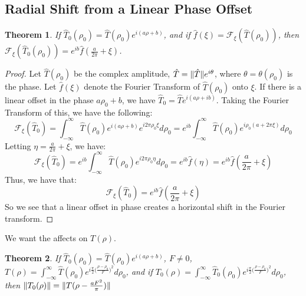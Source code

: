 \documentclass{article}
\theoremstyle{mystyle}
\newtheorem{theorem}{Theorem}[section]
\DeclarePairedDelimiter\norm{\lVert}{\rVert}
\begin{document}
\subsection{Radial Shift from a Linear Phase Offset}
\begin{theorem}
If $\hat{T}_0(\rho_0) = \hat{T}(\rho_0)e^{i(a\rho+b)}$, and if $\hat{f}(\xi) = \mathcal{F}_{\xi}(\hat{T}(\rho_0))$, then $\mathcal{F}_{\xi}(\hat{T}_{0}(\rho_0)) = e^{ib}\hat{f}(\frac{a}{2\pi}+\xi)$.
\end{theorem}
\begin{proof}
\noindent Let $\hat{T}(\rho_0)$ be the complex amplitude, $\hat{T} = \norm{\hat{T}}e^{i\theta}$, where $\theta = \theta(\rho_0)$ is the phase. Let $\hat{f}(\xi)$ denote the Fourier Transform of $\hat{T}(\rho_0)$ onto $\xi$. If there is a linear offset in the phase $a\rho_0+b$, we have $\hat{T}_{0} = \hat{T}e^{i(a\rho+ib)}$. Taking the Fourier Transform of this, we have the following:
\begin{equation*}
\mathcal{F}_{\xi} (\hat{T}_{0})= \int_{-\infty}^{\infty}\hat{T}(\rho_0)e^{i(a\rho+b)}e^{i2\pi \rho_0 \xi}d\rho_0=e^{ib} \int_{-\infty}^{\infty} \hat{T}(\rho_0)e^{i\rho_0(a+2\pi \xi)}d\rho_0
\end{equation*}
Letting $\eta = \frac{a}{2\pi}+\xi$, we have:
\begin{equation*}
\mathcal{F}_{\xi} (\hat{T}_{0}) = e^{ib}\int_{-\infty}^{\infty}\hat{T}(\rho_0)e^{i2\pi\rho_{0}\eta}d\rho_0 = e^{ib}\hat{f}(\eta)= e^{ib}\hat{f}(\frac{a}{2\pi}+\xi)
\end{equation*}
Thus, we have that:
\begin{equation*}
\mathcal{F}_{\xi} (\hat{T}_{0}) = e^{ib}\hat{f}(\frac{a}{2\pi}+\xi)
\end{equation*}
So we see that a linear offset in phase creates a horizontal shift in the Fourier transform.
\end{proof}
We want the affects on $T(\rho)$.
\begin{theorem}
If $\hat{T}_0(\rho_0) = \hat{T}(\rho_0)e^{i(a\rho+b)}$, $F\ne 0$, $T(\rho) = \int_{-\infty}^{\infty}\hat{T}(\rho_0)e^{i\frac{\pi}{2}\big(\frac{\rho-\rho_0}{F}\big)^2} d\rho_0$, and if $T_{0}(\rho) = \int_{-\infty}^{\infty}\hat{T}_{0}(\rho_0)e^{i\frac{\pi}{2}\big(\frac{\rho-\rho_0}{F}\big)^2} d\rho_0$, then $\norm{T_{0}(\rho)} = \norm{T(\rho - \frac{aF^2}{\pi})}$
\end{theorem}
\end{document}
